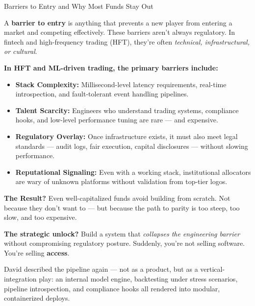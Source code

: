 \begin{TechnicalSidebar}{Barriers to Entry and Why Most Funds Stay Out}

  A \textbf{barrier to entry} is anything that prevents a new player from entering a market and competing effectively.  
  These barriers aren’t always regulatory. In fintech and high-frequency trading (HFT), they’re often 
  \textit{technical, infrastructural, or cultural}.
  
  \medskip
  
  \textbf{In HFT and ML-driven trading, the primary barriers include:}

  \medskip
  
  \begin{itemize}
    \item \textbf{Stack Complexity:}  
    Millisecond-level latency requirements, real-time introspection, and fault-tolerant event handling pipelines.
  
    \item \textbf{Talent Scarcity:}  
    Engineers who understand trading systems, compliance hooks, and low-level performance tuning are rare — and expensive.
  
    \item \textbf{Regulatory Overlay:}  
    Once infrastructure exists, it must also meet legal standards — audit logs, fair execution, capital disclosures — without slowing performance.
  
    \item \textbf{Reputational Signaling:}  
    Even with a working stack, institutional allocators are wary of unknown platforms without validation from top-tier logos.
  \end{itemize}
  
  \medskip
  
  \textbf{The Result?}  
  Even well-capitalized funds avoid building from scratch.  
  Not because they don’t want to — but because the path to parity is too steep, too slow, and too expensive.
  
  \medskip
  
  \textbf{The strategic unlock?}  
  Build a system that \textit{collapses the engineering barrier} without compromising regulatory posture.  
  Suddenly, you’re not selling software. You’re selling \textbf{access}.
  
\end{TechnicalSidebar}


\medskip

David described the pipeline again — not as a product, but as a vertical-integration play:  
an internal model engine, backtesting under stress scenarios, pipeline introspection, and compliance hooks all rendered into modular, containerized deploys.

